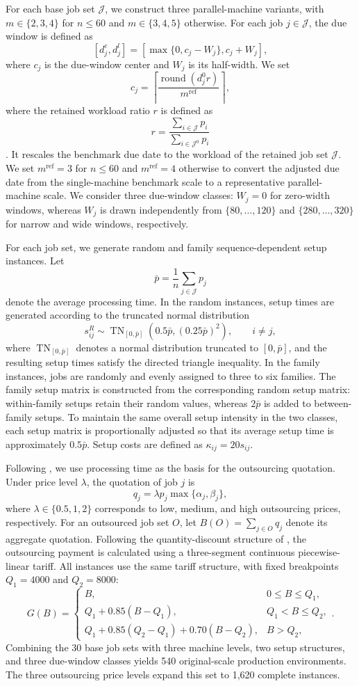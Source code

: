 For each base job set $\mathcal J$, we construct three parallel-machine variants,
with $m\in\{2,3,4\}$ for $n\leq 60$ and $m\in\{3,4,5\}$ otherwise. For each job
$j\in\mathcal J$, the due window is defined as
\[
[d_j^e,d_j^l]=[\max\{0,c_j-W_j\},c_j+W_j],
\]
where $c_j$ is the due-window center and $W_j$ is its half-width. We set
\[
c_j=\left\lceil\frac{\operatorname{round}(d_j^0r)}{m^{\mathrm{ref}}}\right\rceil,
\]
where the retained workload ratio $r$ is defined as
\[
r=\frac{\sum_{i\in\mathcal J}p_i}{\sum_{i\in\mathcal J^0}p_i}
\].
It rescales the benchmark due date to the workload of the retained job set
$\mathcal J$. We set $m^{\mathrm{ref}}=3$ for $n\leq60$ and
$m^{\mathrm{ref}}=4$ otherwise to convert the adjusted due date from the
single-machine benchmark scale to a representative parallel-machine scale. We
consider three due-window classes: $W_j=0$ for zero-width windows, whereas $W_j$ is
drawn independently from $\{80,\ldots,120\}$ and $\{280,\ldots,320\}$ for narrow
and wide windows, respectively.

For each job set, we generate random and family sequence-dependent setup instances.
Let
\[
\bar p=\frac{1}{n}\sum_{j\in\mathcal J}p_j
\]
denote the average processing time. In the random instances, setup times are
generated according to the truncated normal distribution
\[
s_{ij}^{R}\sim
\operatorname{TN}_{[0,\bar p]}\left(0.5\bar p,(0.25\bar p)^2\right),
\qquad i\ne j,
\]
where $\operatorname{TN}_{[0,\bar p]}$ denotes a normal distribution truncated to
$[0,\bar p]$, and the resulting setup times satisfy the directed triangle inequality.
In the family instances, jobs are randomly and evenly assigned to three to six
families. The family setup matrix is constructed from the corresponding random setup
matrix: within-family setups retain their random values,
whereas $2\bar p$ is added to between-family setups. To maintain the same overall
setup intensity in the two classes, each setup matrix is proportionally adjusted so
that its average setup time is approximately $0.5\bar p$. Setup costs are defined as
$\kappa_{ij}=20s_{ij}$.

Following \citet{lee2011twostage}, we use processing time as the basis for the
outsourcing quotation. Under price level $\lambda$, the quotation of job $j$ is
\[
q_j=\lambda p_j\max\{\alpha_j,\beta_j\},
\]
where $\lambda\in\{0.5,1,2\}$ corresponds to low, medium, and high outsourcing
prices, respectively. For an outsourced job set $O$, let
$B(O)=\sum_{j\in O}q_j$ denote its aggregate quotation. Following the
quantity-discount structure of \citet{dabia2019rich}, the outsourcing payment is
calculated using a three-segment continuous piecewise-linear tariff. All instances
use the same tariff structure, with fixed breakpoints $Q_1=4000$ and $Q_2=8000$:
\[
G(B)=
\begin{cases}
B, & 0\leq B\leq Q_1,\\
Q_1+0.85(B-Q_1), & Q_1<B\leq Q_2,\\
Q_1+0.85(Q_2-Q_1)+0.70(B-Q_2), & B>Q_2,
\end{cases}.
\]
Combining the 30 base job sets with three machine levels, two setup structures, and
three due-window classes yields 540 original-scale production environments. The
three outsourcing price levels expand this set to 1,620 complete instances.

